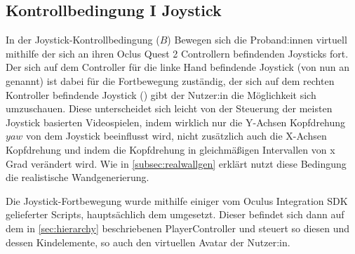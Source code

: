         \subsection{Kontrollbedingung I Joystick}\label{subsec:joystick}
            In der Joystick-Kontrollbedingung ($B$) Bewegen sich die Proband:innen virtuell mithilfe der sich an ihren Oclus Quest 2 Controllern befindenden Joysticks fort. %
            Der sich auf dem Controller für die linke Hand befindende Joystick (von nun an  genannt) ist dabei für die Fortbewegung zuständig, der sich auf dem rechten Kontroller befindende Joystick () gibt der Nutzer:in die Möglichkeit sich umzuschauen. Diese unterscheidet sich leicht von der Steuerung der meisten Joystick basierten Videospielen, indem wirklich nur die Y-Achsen Kopfdrehung $yaw$ von dem Joystick beeinflusst wird, nicht zusätzlich auch die X-Achsen Kopfdrehung und indem die Kopfdrehung in gleichmäßigen Intervallen von x Grad %
            verändert wird. %
            Wie in \autoref{subsec:realwallgen} erklärt nutzt diese Bedingung die realistische Wandgenerierung.

            Die Joystick-Fortbewegung wurde mithilfe einiger vom Oculus Integration SDK gelieferter Scripts, hauptsächlich dem  umgesetzt. Dieser befindet sich dann auf dem in \autoref{sec:hierarchy} beschriebenen PlayerController und steuert so diesen und dessen Kindelemente, so auch den virtuellen Avatar der Nutzer:in.




